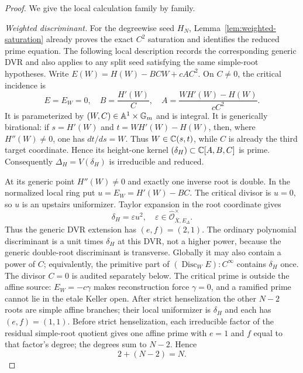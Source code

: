 \begin{proof}
We give the local calculation family by family.

\smallskip
\noindent\emph{Weighted discriminant.}
For the degreewise seed $H_N$, Lemma~\ref{lem:weighted-saturation} already
proves the exact $C^2$ saturation and identifies the reduced prime equation.
The following local description records the corresponding generic DVR and
also applies to any split seed satisfying the same simple-root hypotheses.
Write $E(W)=H(W)-BCW+cAC^2$.  On $C\ne0$, the critical incidence is
\[
 E=E_W=0,\quad
 B=\frac{H'(W)}{C},\quad
 A=\frac{WH'(W)-H(W)}{cC^2}.                             \tag{4.2}
\]
It is parameterized by $(W,C)\in\mathbb A^1\times\mathbb G_m$ and is integral.
It is generically birational: if $s=H'(W)$ and
$t=WH'(W)-H(W)$, then, where $H''(W)\ne0$, one has $dt/ds=W$.
Thus $W\in\mathbb C(s,t)$, while $C$ is already the third target coordinate.  Hence
its height-one kernel
$(\delta_H)\subset\mathbb C[A,B,C]$ is prime.  Consequently
$\Delta_H=V(\delta_H)$ is irreducible and reduced.

At its generic point $H''(W)\ne0$ and exactly one inverse root is double.
In the normalized local ring put $u=E_W=H'(W)-BC$.  The critical divisor is
$u=0$, so $u$ is an upstairs uniformizer.  Taylor expansion in the root
coordinate gives
\[
 \delta_H=\varepsilon u^2,\quad
 \varepsilon\in
 \widehat{\mathcal O}_{\overline X,E_\Delta}^{\times}.   \tag{4.3}
\]
Thus the generic DVR extension has $(e,f)=(2,1)$.  The ordinary polynomial
discriminant is a unit times $\delta_H$ at this DVR, not a higher power,
because the generic double-root discriminant is transverse.  Globally it
may also contain a power of $C$; equivalently, the primitive part of
$(\operatorname{Disc}_W E):C^\infty$ contains $\delta_H$ once.  The divisor
$C=0$ is audited separately below.  The critical prime is outside the affine
source: $E_W=-c\gamma$ makes reconstruction force $\gamma=0$, and a ramified
prime cannot lie in the etale Keller open.  After strict
henselization the other $N-2$ roots are simple affine branches; their local
uniformizer is $\delta_H$ and each has $(e,f)=(1,1)$.  Before strict
henselization, each irreducible factor of the residual simple-root quotient
gives one affine prime with $e=1$ and $f$ equal to that factor's degree; the
degrees sum to $N-2$.  Hence
\[
 2+(N-2)=N.                                               \tag{4.4}
\]


\end{proof}
